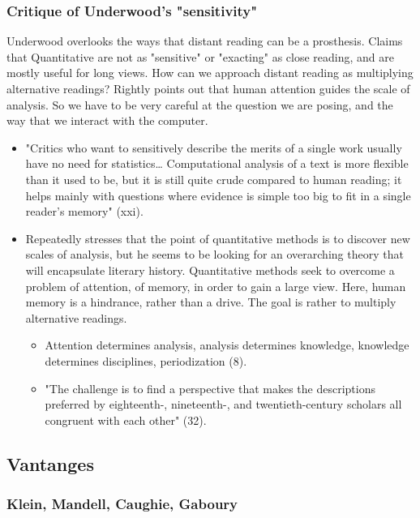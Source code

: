\documentclass[11pt]{article}
\begin{document}
\subsubsection{Critique of Underwood's "sensitivity"}
\label{sec:orge8a21fd}

Underwood overlooks the ways that distant reading can be a
prosthesis. Claims that Quantitative are not as "sensitive" or
"exacting" as close reading, and are mostly useful for long views. How
can we approach distant reading as multiplying alternative readings?
Rightly points out that human attention guides the scale of
analysis. So we have to be very careful at the question we are posing,
and the way that we interact with the computer.
\begin{itemize}
\item "Critics who want to sensitively describe the merits of a single
work usually have no need for statistics\ldots{} Computational
analysis of a text is more flexible than it used to be, but it
is still quite crude compared to human reading; it helps mainly
with questions where evidence is simple too big to fit in a
single reader's memory" (xxi).
\end{itemize}
\begin{itemize}
\item Repeatedly stresses that the point of quantitative methods is to
discover new scales of analysis, but he seems to be looking for an
overarching theory that will encapsulate literary
history. Quantitative methods seek to overcome a problem of
attention, of memory, in order to gain a large view. Here, human
memory is a hindrance, rather than a drive. The goal is rather to
multiply alternative readings. 
\begin{itemize}
\item Attention determines analysis, analysis determines knowledge,
knowledge determines disciplines, periodization (8).
\item "The challenge is to find a perspective that makes the descriptions
preferred by eighteenth-, nineteenth-, and twentieth-century
scholars all congruent with each other" (32).
\end{itemize}
\end{itemize}


\subsection{Vantanges}
\label{sec:orgc1fd73d}

\subsubsection{Klein, Mandell, Caughie, Gaboury}
\label{sec:orga15ae4d}
\end{document}
